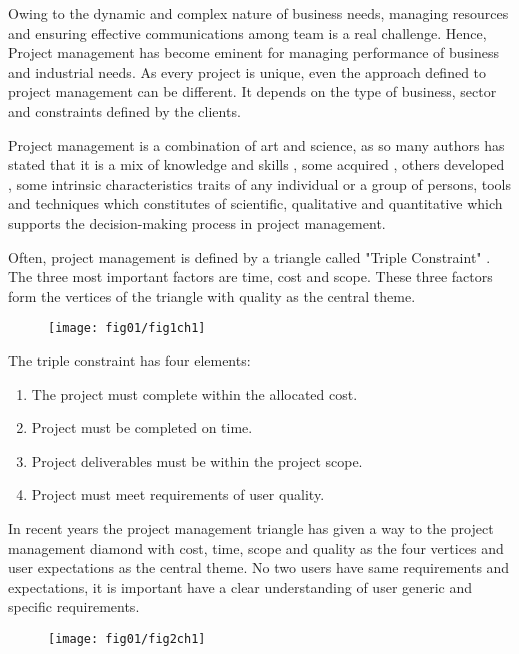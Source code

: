 Owing to the dynamic and complex nature of business needs, managing resources and ensuring effective communications among team is a real challenge. Hence, Project management has become eminent for managing performance of business and industrial needs.
As every project is unique, even the approach defined to project management can be different. It depends on the type of business, sector and constraints defined by the clients. 
 
Project management \cite{activecolab} is a combination of art and science, as so many authors has stated that it is a mix of knowledge and skills , some acquired , others developed , some intrinsic characteristics traits of any individual or a group of persons, tools and techniques which constitutes of scientific, qualitative and quantitative which supports the decision-making process in project management.

Often, project management is defined by a triangle called "Triple Constraint" \cite{Baratta}. The three most important factors are time, cost and scope. These three factors form the vertices of the triangle with quality as the central theme. 


\begin{figure}
\centering
  \texttt{[image: fig01/fig1ch1]}
 \end{figure}


The triple constraint has four elements:
\begin{enumerate}
    \item The project must complete within the allocated cost.
    \item Project must be completed on time. 
    \item Project deliverables must be within the project scope.
    \item Project must meet requirements of user quality.
\end{enumerate}
In recent years the project management triangle has given a way to the project management diamond \cite{Shenhar} with cost, time, scope and quality as the four vertices and user expectations as the central theme. No two users have same requirements and expectations, it is important have a clear understanding of user generic and specific requirements. 



 \begin{figure}
\centering
  \texttt{[image: fig01/fig2ch1]}
 \end{figure}

